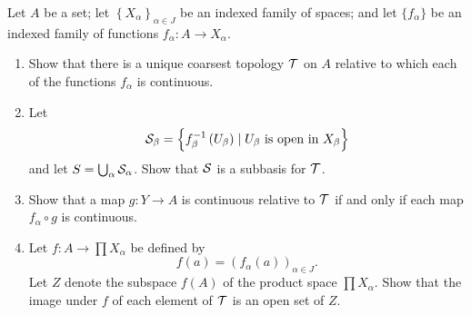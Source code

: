\begin{ex}{19.10}
    Let $A$ be a set; let $\left\{X_\alpha\right\}_{\alpha\in J}$ be an indexed family of spaces; 
    and let $\{f_\alpha\}$ be an indexed family of functions $f_\alpha:A\to X_\alpha$.
    \begin{enumerate}
        \item Show that there is a unique coarsest topology $\mathcal{T}$ on $A$ relative to which each of the 
        functions $f_\alpha$ is continuous.
        \item Let
            $$\mathcal{S}_\beta =\left\{f^{-1}_\beta\left(U_\beta\right)\mid U_\beta \text{ is open in } X_\beta\right\}$$
            and let $S=\bigcup_\alpha \mathcal{S}_\alpha$. Show that $\mathcal{S}$ is a subbasis for $\mathcal{T}$.
        \item Show that a map $g:Y\to A$ is continuous relative to $\mathcal{T}$ if and only if each map 
        $f_\alpha\circ g$ is continuous. 
        \item Let $f:A\to\prod X_\alpha$ be defined by
            $$ f(a)=\left(f_\alpha(a)\right)_{\alpha\in J}.$$
            Let $Z$ denote the subspace $f(A)$  of the product space $\prod X_\alpha$. 
            Show that the image under $f$ of each element of $\mathcal{T}$ is an open set of $Z$.
    \end{enumerate}
\end{ex}

